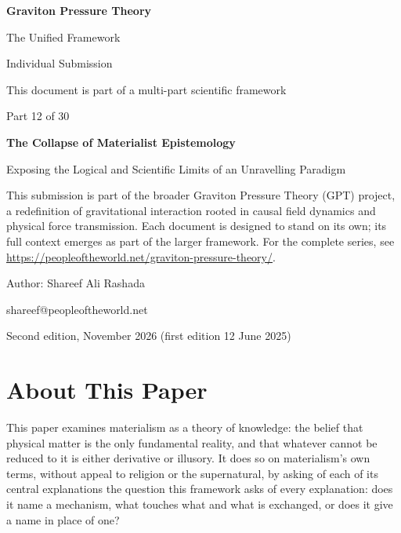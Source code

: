 \documentclass[11pt,a4paper]{article}
\begin{document}
\renewcommand{\thetable}{12.\arabic{table}}
\begin{titlepage}
\centering
\vspace*{1.5cm}
{\Huge\bfseries Graviton Pressure Theory\par}
\vspace{0.4cm}
{\Large The Unified Framework\par}
{\large Individual Submission\par}
\vspace{0.3cm}
{\normalsize This document is part of a multi-part scientific framework\par}
\vspace{1.6cm}
{\large Part 12 of 30\par}
\vspace{0.6cm}
{\huge\bfseries The Collapse of Materialist Epistemology\par}
\vspace{0.5cm}
{\Large Exposing the Logical and Scientific Limits of an Unravelling Paradigm\par}
\vspace{1.4cm}
\begin{minipage}{0.82\textwidth}\centering\small
This submission is part of the broader Graviton Pressure Theory (GPT) project, a redefinition of gravitational interaction rooted in causal field dynamics and physical force transmission. Each document is designed to stand on its own; its full context emerges as part of the larger framework. For the complete series, see \url{https://peopleoftheworld.net/graviton-pressure-theory/}.
\end{minipage}
\vfill
{\large Author: Shareef Ali Rashada\par}
{\normalsize shareef@peopleoftheworld.net\par}
\vspace{0.3cm}
{\normalsize Second edition, November 2026 \quad (first edition 12 June 2025)\par}
\end{titlepage}

\tableofcontents
\newpage

\section*{About This Paper}

This paper examines materialism as a theory of knowledge: the belief that physical matter is the only fundamental reality, and that whatever cannot be reduced to it is either derivative or illusory. It does so on materialism's own terms, without appeal to religion or the supernatural, by asking of each of its central explanations the question this framework asks of every explanation: does it name a mechanism, what touches what and what is exchanged, or does it give a name in place of one?
\end{document}
